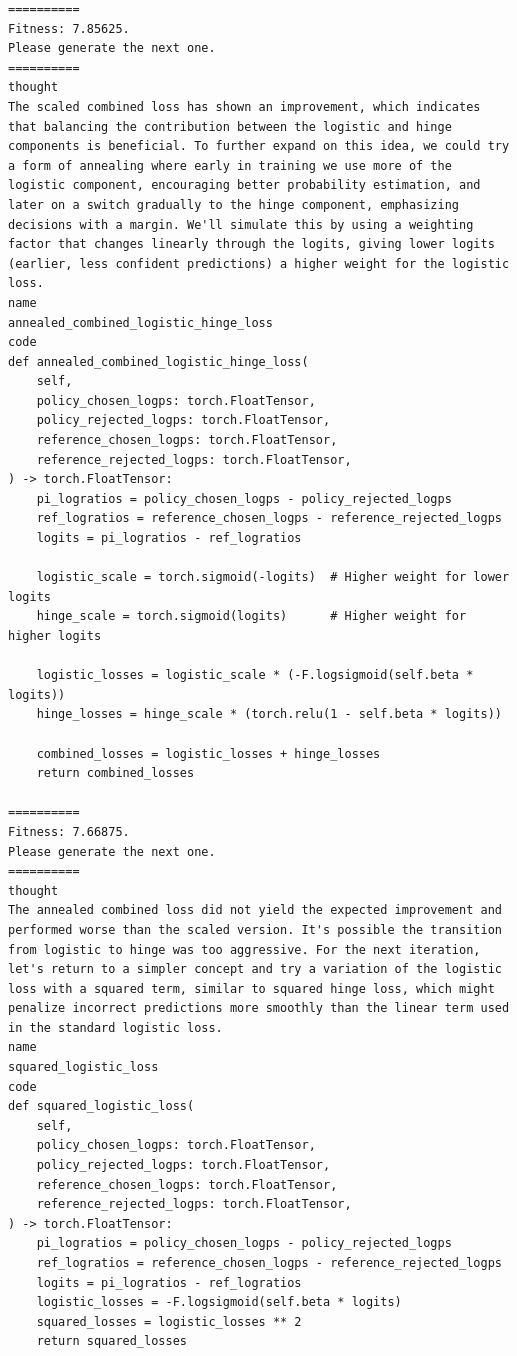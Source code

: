 \documentclass{article}
\theoremstyle{plain}
\theoremstyle{definition}
\theoremstyle{remark}
\begin{document}
\begin{lstlisting}
==========
Fitness: 7.85625.
Please generate the next one.
==========
thought
The scaled combined loss has shown an improvement, which indicates that balancing the contribution between the logistic and hinge components is beneficial. To further expand on this idea, we could try a form of annealing where early in training we use more of the logistic component, encouraging better probability estimation, and later on a switch gradually to the hinge component, emphasizing decisions with a margin. We'll simulate this by using a weighting factor that changes linearly through the logits, giving lower logits (earlier, less confident predictions) a higher weight for the logistic loss.
name
annealed_combined_logistic_hinge_loss
code
def annealed_combined_logistic_hinge_loss(
    self,
    policy_chosen_logps: torch.FloatTensor,
    policy_rejected_logps: torch.FloatTensor,
    reference_chosen_logps: torch.FloatTensor,
    reference_rejected_logps: torch.FloatTensor,
) -> torch.FloatTensor:
    pi_logratios = policy_chosen_logps - policy_rejected_logps
    ref_logratios = reference_chosen_logps - reference_rejected_logps
    logits = pi_logratios - ref_logratios

    logistic_scale = torch.sigmoid(-logits)  # Higher weight for lower logits
    hinge_scale = torch.sigmoid(logits)      # Higher weight for higher logits

    logistic_losses = logistic_scale * (-F.logsigmoid(self.beta * logits))
    hinge_losses = hinge_scale * (torch.relu(1 - self.beta * logits))

    combined_losses = logistic_losses + hinge_losses
    return combined_losses
    
==========
Fitness: 7.66875.
Please generate the next one.
==========
thought
The annealed combined loss did not yield the expected improvement and performed worse than the scaled version. It's possible the transition from logistic to hinge was too aggressive. For the next iteration, let's return to a simpler concept and try a variation of the logistic loss with a squared term, similar to squared hinge loss, which might penalize incorrect predictions more smoothly than the linear term used in the standard logistic loss.
name
squared_logistic_loss
code
def squared_logistic_loss(
    self,
    policy_chosen_logps: torch.FloatTensor,
    policy_rejected_logps: torch.FloatTensor,
    reference_chosen_logps: torch.FloatTensor,
    reference_rejected_logps: torch.FloatTensor,
) -> torch.FloatTensor:
    pi_logratios = policy_chosen_logps - policy_rejected_logps
    ref_logratios = reference_chosen_logps - reference_rejected_logps
    logits = pi_logratios - ref_logratios
    logistic_losses = -F.logsigmoid(self.beta * logits)
    squared_losses = logistic_losses ** 2
    return squared_losses
    

\end{lstlisting}
\end{document}
